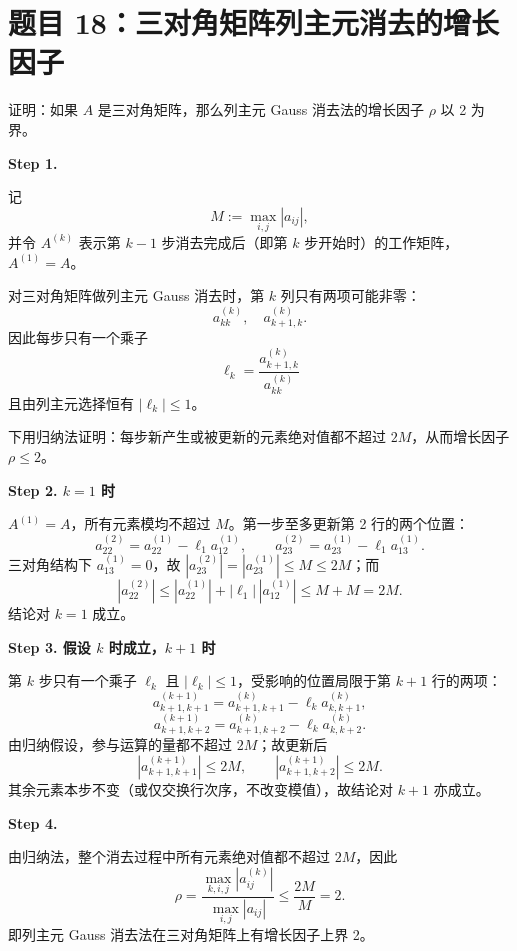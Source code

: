 \documentclass{article}
\begin{document}
\section{题目 18：三对角矩阵列主元消去的增长因子}

证明：如果 $A$ 是三对角矩阵，那么列主元 Gauss 消去法的增长因子 $\rho$ 以 2 为界。

\begin{solution}

  \textbf{Step 1.}

  记
  \[
    M:=\max_{i,j}|a_{ij}|,
  \]
  并令 $A^{(k)}$ 表示第 $k-1$ 步消去完成后（即第 $k$ 步开始时）的工作矩阵，$A^{(1)}=A$。

  对三对角矩阵做列主元 Gauss 消去时，第 $k$ 列只有两项可能非零：
  \[
    a_{kk}^{(k)},\quad a_{k+1,k}^{(k)}.
  \]
  因此每步只有一个乘子
  \[
    \ell_k=\frac{a_{k+1,k}^{(k)}}{a_{kk}^{(k)}}
  \]
  且由列主元选择恒有 $|\ell_k|\le 1$。

  下用归纳法证明：每步新产生或被更新的元素绝对值都不超过 $2M$，从而增长因子 $\rho\le 2$。

  \textbf{Step 2. $k=1$ 时}

  $A^{(1)}=A$，所有元素模均不超过 $M$。第一步至多更新第 2 行的两个位置：
  \[
    a_{22}^{(2)} = a_{22}^{(1)}-\ell_1 a_{12}^{(1)},
    \qquad
    a_{23}^{(2)} = a_{23}^{(1)}-\ell_1 a_{13}^{(1)}.
  \]
  三对角结构下 $a_{13}^{(1)}=0$，故 $|a_{23}^{(2)}|=|a_{23}^{(1)}|\le M\le 2M$；而
  \[
    |a_{22}^{(2)}|
    \le |a_{22}^{(1)}|+|\ell_1|\,|a_{12}^{(1)}|
    \le M+M=2M.
  \]
  结论对 $k=1$ 成立。

  \textbf{Step 3. 假设 $k$ 时成立，$k+1$ 时}

  第 $k$ 步只有一个乘子 $\ell_k$ 且 $|\ell_k|\le 1$，受影响的位置局限于第 $k+1$ 行的两项：
  \[
    a_{k+1,k+1}^{(k+1)} = a_{k+1,k+1}^{(k)}-\ell_k a_{k,k+1}^{(k)},
  \]
  \[
    a_{k+1,k+2}^{(k+1)} = a_{k+1,k+2}^{(k)}-\ell_k a_{k,k+2}^{(k)}.
  \]
  由归纳假设，参与运算的量都不超过 $2M$；故更新后
  \[
    |a_{k+1,k+1}^{(k+1)}|\le 2M,
    \qquad
    |a_{k+1,k+2}^{(k+1)}|\le 2M.
  \]
  其余元素本步不变（或仅交换行次序，不改变模值），故结论对 $k+1$ 亦成立。

  \textbf{Step 4.}

  由归纳法，整个消去过程中所有元素绝对值都不超过 $2M$，因此
  \[
    \rho
    =\frac{\max\limits_{k,i,j}|a_{ij}^{(k)}|}{\max\limits_{i,j}|a_{ij}|}
    \le \frac{2M}{M}=2.
  \]
  即列主元 Gauss 消去法在三对角矩阵上有增长因子上界 2。

\end{solution}
\end{document}
